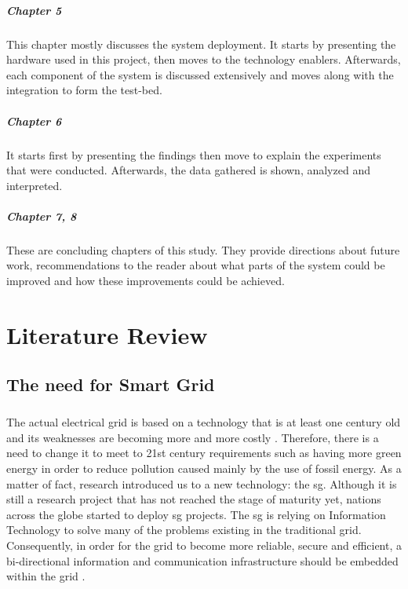 \documentclass[oneside,12pt,a4paper,final]{book}
\begin{document}
\paragraph{Chapter 5}
This chapter mostly discusses the system deployment. It starts by presenting the hardware used in this project, then moves to the technology enablers. Afterwards, each component of the system is discussed extensively and moves along with the integration to form the test-bed.
\paragraph{Chapter 6}
It starts first by presenting the findings then move to explain the experiments that were conducted. Afterwards, the data gathered is shown, analyzed and interpreted.
\paragraph{Chapter 7, 8}
These are concluding chapters of this study. They provide directions about future work, recommendations to the reader about what parts of the system could be improved and how these improvements could be achieved.

\chapter{Literature Review}
\section{The need for Smart Grid}
\paragraph{}
The actual electrical grid is based on a technology that is at least one century old and its weaknesses are becoming more and more costly \cite{ref5}. Therefore, there is a need to change it to meet to 21st century requirements such as having more green energy in order to reduce pollution caused mainly by the use of fossil energy. As a matter of fact, research introduced us to a new technology: the \gls{sg}. Although it is still a research project that has not reached the stage of maturity yet, nations across the globe started to deploy \gls{sg} projects. The \gls{sg} is relying on Information Technology to solve many of the problems existing in the traditional grid. Consequently, in order for the grid to become more reliable, secure and efficient, a bi-directional information and communication infrastructure should be embedded within the grid \cite{ref5}.
\end{document}

